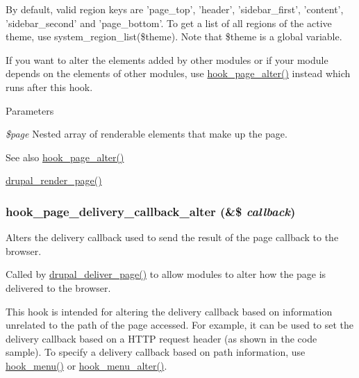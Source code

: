 By default, valid region keys are 'page\_\-top', 'header', 'sidebar\_\-first', 'content', 'sidebar\_\-second' and 'page\_\-bottom'. To get a list of all regions of the active theme, use system\_\-region\_\-list(\$theme). Note that \$theme is a global variable.

If you want to alter the elements added by other modules or if your module depends on the elements of other modules, use \hyperlink{group__hooks_gaa965aa8f38b48aed1a19c556c199145f}{hook\_\-page\_\-alter()} instead which runs after this hook.


\begin{DoxyParams}{Parameters}
\item[{\em \$page}]Nested array of renderable elements that make up the page.\end{DoxyParams}
\begin{DoxySeeAlso}{See also}
\hyperlink{group__hooks_gaa965aa8f38b48aed1a19c556c199145f}{hook\_\-page\_\-alter()} 

\hyperlink{common_8inc_ad85d021b660f070849ed7c215d9758fe}{drupal\_\-render\_\-page()} 
\end{DoxySeeAlso}
\hypertarget{group__hooks_gaee6a1d02d5046d47069a8e385385ef15}{
\subsubsection[{hook\_\-page\_\-delivery\_\-callback\_\-alter}]{\setlength{\rightskip}{0pt plus 5cm}hook\_\-page\_\-delivery\_\-callback\_\-alter (\&\$ {\em callback})}}
\label{group__hooks_gaee6a1d02d5046d47069a8e385385ef15}
Alters the delivery callback used to send the result of the page callback to the browser.

Called by \hyperlink{common_8inc_a1537b4ccc064fb7d8106effcac8caac3}{drupal\_\-deliver\_\-page()} to allow modules to alter how the page is delivered to the browser.

This hook is intended for altering the delivery callback based on information unrelated to the path of the page accessed. For example, it can be used to set the delivery callback based on a HTTP request header (as shown in the code sample). To specify a delivery callback based on path information, use \hyperlink{group__hooks_ga5c95244fea59b25666e409759e133ded}{hook\_\-menu()} or \hyperlink{group__hooks_ga4c37deddcf48dbfe6f3081df1652f6fa}{hook\_\-menu\_\-alter()}.

